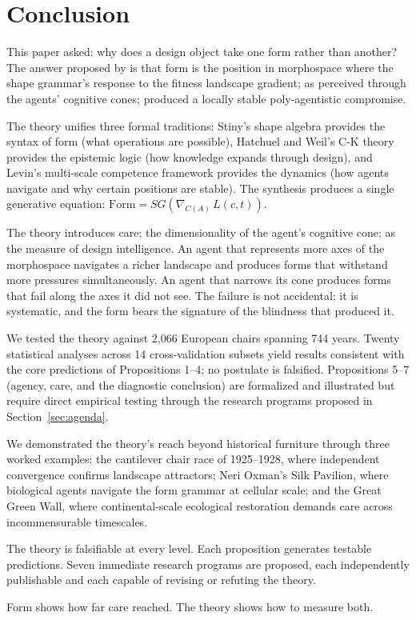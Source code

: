\section{Conclusion}
\label{sec:conclusion}

This paper asked: why does a design object take one form rather than another? The answer proposed by \formlaere{} is that form is the position in morphospace where the shape grammar's response to the fitness landscape gradient; as perceived through the agents' cognitive cones; produced a locally stable poly-agentistic compromise.

The theory unifies three formal traditions: Stiny's shape algebra provides the syntax of form (what operations are possible), Hatchuel and Weil's C-K theory provides the epistemic logic (how knowledge expands through design), and Levin's multi-scale competence framework provides the dynamics (how agents navigate and why certain positions are stable). The synthesis produces a single generative equation: $\mathrm{Form} = SG(\nabla_{C(A)}\, L(c,t))$.

The theory introduces care; the dimensionality of the agent's cognitive cone; as the measure of design intelligence. An agent that represents more axes of the morphospace navigates a richer landscape and produces forms that withstand more pressures simultaneously. An agent that narrows its cone produces forms that fail along the axes it did not see. The failure is not accidental; it is systematic, and the form bears the signature of the blindness that produced it.

We tested the theory against 2,066 European chairs spanning 744 years. Twenty statistical analyses across 14 cross-validation subsets yield results consistent with the core predictions of Propositions 1--4; no postulate is falsified. Propositions 5--7 (agency, care, and the diagnostic conclusion) are formalized and illustrated but require direct empirical testing through the research programs proposed in Section~\ref{sec:agenda}.

We demonstrated the theory's reach beyond historical furniture through three worked examples: the cantilever chair race of 1925--1928, where independent convergence confirms landscape attractors; Neri Oxman's Silk Pavilion, where biological agents navigate the form grammar at cellular scale; and the Great Green Wall, where continental-scale ecological restoration demands care across incommensurable timescales.

The theory is falsifiable at every level. Each proposition generates testable predictions. Seven immediate research programs are proposed, each independently publishable and each capable of revising or refuting the theory.

Form shows how far care reached. The theory shows how to measure both.
